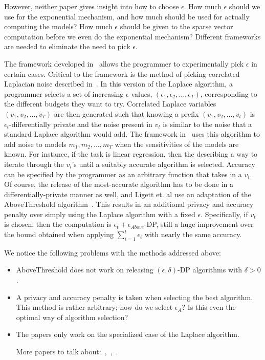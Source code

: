 \documentclass[11pt]{report}
\begin{document}
However, neither paper gives insight into how to choose $\epsilon$. How much $\epsilon$ should we use for the exponential mechanism, and how much should be used for actually computing the models? How much $\epsilon$ should be given to the sparse vector computation before we even do the exponential mechanism? Different frameworks are needed to eliminate the need to pick $\epsilon$.

The framework developed in~\cite{Ligett:2017} allows the programmer to experimentally pick $\epsilon$ in certain cases. Critical to the framework is the method of picking correlated Laplacian noise described in~\cite{Koufogiannis:2015}. In this version of the Laplace algorithm, a programmer selects a set of increasing $\epsilon$ values, $(\epsilon_1, \epsilon_2, \ldots, \epsilon_T)$, corresponding to the different budgets they want to try. Correlated Laplace variables $(v_1, v_2, \ldots, v_T)$ are then generated such that knowing a prefix $(v_1, v_2, \ldots, v_t)$ is $\epsilon_t$-differentially private and the noise present in $v_t$ is similar to the noise that a standard Laplace algorithm would add. The framework in~\cite{Ligett:2017} uses this algorithm to add noise to models $m_1, m_2, \ldots, m_T$ when the sensitivities of the models are known. For instance, if the task is linear regression, then the describing a way to iterate through the $v_i$'s until a suitably accurate algorithm is selected. Accuracy can be specified by the programmer as an arbitrary function that takes in a $v_i$. Of course, the release of the most-accurate algorithm has to be done in a differentially-private manner as well, and Ligett et. al use an adaptation of the AboveThreshold algorithm~\cite{Dwork:2006}. This results in an additional privacy and accuracy penalty over simply using the Laplace algorithm with a fixed $\epsilon$. Specifically, if $v_t$ is chosen, then the computation is $\epsilon_t+\epsilon_{Above}$-DP, still a huge improvement over the bound obtained when applying $\sum_{i=1}^t \epsilon_i$ with nearly the same accuracy.

We notice the following problems with the methods addressed above:
\begin{itemize}
\item AboveThreshold does not work on releasing $(\epsilon, \delta)$-DP algorithms with $\delta > 0$.
\item A privacy and accuracy penalty is taken when selecting the best algorithm. This method is rather arbitrary; how do we select $\epsilon_A$? Is this even the optimal way of algorithm selection?
\item The papers only work on the specialized case of the Laplace algorithm.

More papers to talk about:~\cite{Winograd-Cort:2017},~\cite{Liu:2018},~\cite{Hsu:2014}.
\end{itemize}
\end{document}
